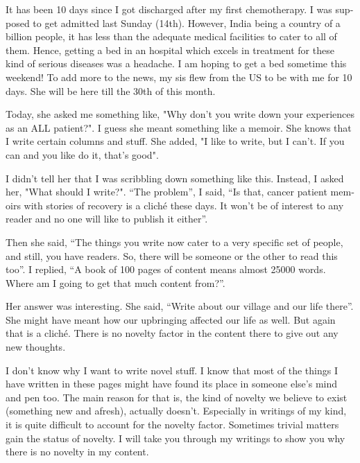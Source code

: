 \vskip 2pt
\begin{english}
\date{Friday November 19 2010}

It has been 10 days since I got discharged after my first chemotherapy. I was supposed to get admitted last Sunday (14th). However, India being a country of a billion people, it has less than the adequate medical facilities to cater to all of them. Hence, getting a bed in an hospital which excels in treatment for these kind of serious diseases was a headache. I am hoping to get a bed sometime this weekend! To add more to the news, my sis flew from the US to be with me for 10 days. She will be here till the 30th of this month. 

Today, she asked me something like, "Why don't you write down your experiences as an ALL patient?". I guess she meant something like a memoir. She knows that I write certain columns and stuff. She added, "I like to write, but I can't. If you can and you like do it, that's good".

I didn't tell her that I was scribbling down something like this. Instead, I asked her, "What should I write?". ``The problem'', I said, ``Is that, cancer patient memoirs with stories of recovery is a cliché these days. It won't be of interest to any reader and no one will like to publish it either''.

Then she said, ``The things you write now cater to a very specific set of people, and still, you have readers. So, there will be someone or the other to read this too''. I replied, ``A book of 100 pages of content means almost 25000 words. Where am I going to get that much content from?''. 

Her answer was interesting. She said, ``Write about our village and our life there''. She might have meant how our upbringing affected our life as well. But again that is a cliché. There is no novelty factor in the content there to give out any new thoughts.

I don't know why I want to write novel stuff. I know that most of the things I have written in these pages might have found its place in someone else's mind and pen too. The main reason for that is, the kind of novelty we believe to exist (something new and afresh), actually doesn't. Especially in writings of my kind, it is quite difficult to account for the novelty factor. Sometimes trivial matters gain the status of novelty. I will take you through my writings to show you why there is no novelty in my content. 


\end{english}
